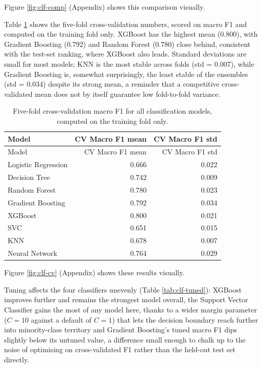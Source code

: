 \documentclass[11pt,a4paper]{article}
\begin{document}
Figure \ref{fig:clf-comp} (Appendix) shows this comparison visually.

Table \ref{tab:clf-cv} shows the five-fold cross-validation numbers,
scored on macro F1 and computed on the training fold only. XGBoost has
the highest mean (0.800), with Gradient Boosting (0.792) and Random
Forest (0.780) close behind, consistent with the test-set ranking, where
XGBoost also leads. Standard deviations are small for most models; KNN
is the most stable across folds (std = 0.007), while Gradient Boosting
is, somewhat surprisingly, the least stable of the ensembles (std =
0.034) despite its strong mean, a reminder that a competitive
cross-validated mean does not by itself guarantee low fold-to-fold
variance.

\begin{longtable}[]{@{}lrr@{}}
\caption{\label{tab:clf-cv}Five-fold cross-validation macro F1 for all
classification models, computed on the training fold
only.}\tabularnewline
\toprule\noalign{}
Model & CV Macro F1 mean & CV Macro F1 std \\
\midrule\noalign{}
\endfirsthead
\toprule\noalign{}
Model & CV Macro F1 mean & CV Macro F1 std \\
\midrule\noalign{}
\endhead
\bottomrule\noalign{}
\endlastfoot
Logistic Regression & 0.666 & 0.022 \\
Decision Tree & 0.742 & 0.009 \\
Random Forest & 0.780 & 0.023 \\
Gradient Boosting & 0.792 & 0.034 \\
XGBoost & 0.800 & 0.021 \\
SVC & 0.651 & 0.015 \\
KNN & 0.678 & 0.007 \\
Neural Network & 0.764 & 0.029 \\
\end{longtable}

Figure \ref{fig:clf-cv} (Appendix) shows these results visually.

Tuning affects the four classifiers unevenly (Table
\ref{tab:clf-tuned}): XGBoost improves further and remains the strongest
model overall, the Support Vector Classifier gains the most of any model
here, thanks to a wider margin parameter (\(C = 10\) against a default
of \(C = 1\)) that lets the decision boundary reach further into
minority-class territory and Gradient Boosting's tuned macro F1 dips
slightly below its untuned value, a difference small enough to chalk up
to the noise of optimising on cross-validated F1 rather than the
held-out test set directly.
\end{document}
